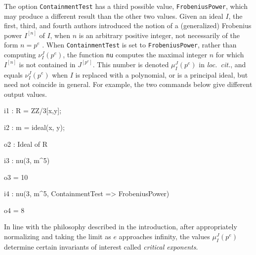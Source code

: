 \documentclass{amsart}
\begin{document}

The option {\tt ContainmentTest} has a third possible value, {\tt FrobeniusPower}, which may produce a different result than the other two values.
Given an ideal $I$, the first, third, and fourth authors introduced the notion of a (generalized) Frobenius power $I^{[n]}$ of $I$, when $n$ is an arbitrary positive integer, not necessarily of the form $n = p^e$ \cite{hernandez+etal.frobenius_powers}.
When {\tt ContainmentTest} is set to {\tt FrobeniusPower}, rather than  computing $\nu_I^J(p^e)$, the function {\tt nu} computes the
maximal integer $n$ for which $I^{[n]}$ is not contained in $J^{[p^e]}$.  This number is denoted $\mu_I^J(p^e)$ in \emph{loc.\ cit.}, and equals $\nu_I^J(p^e)$ when $I$ is replaced with a polynomial, or is a principal ideal, but need not coincide in general.
For example, the two commands below give different output values.

{\small
{}
\begin{MyVerbatim}

i1 : R = ZZ/3[x,y];

i2 : m = ideal(x, y);

o2 : Ideal of R

i3 : nu(3, m^5)

o3 = 10

i4 : nu(3, m^5, ContainmentTest => FrobeniusPower)

o4 = 8
\end{MyVerbatim}
}

\medspace
\noindent In line with the philosophy described in the introduction, after appropriately normalizing and taking the limit as $e$ approaches infinity, the values $\mu_I^J(p^e)$ determine certain invariants of interest called \emph{critical exponents}.








\end{document}
